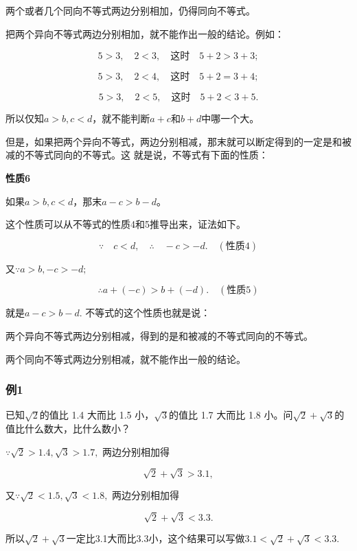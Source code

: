 两个或者几个同向不等式两边分别相加，仍得同向不等式。

把两个异向不等式两边分别相加，就不能作出一般的结论。例如：

\[
5>3, \quad 2 < 3, \quad \text{这时} \quad 5 + 2 > 3 + 3;
\]

\[
5>3, \quad 2 < 4, \quad \text{这时} \quad 5 + 2 = 3 + 4;
\]

\[
5>3, \quad 2 < 5, \quad \text{这时} \quad 5 + 2 < 3 + 5.
\]

所以仅知\(a > b, c < d\)，就不能判断\(a + c\)和\(b + d\)中哪一个大。

但是，如果把两个异向不等式，两边分别相减，那末就可以断定得到的一定是和被减的不等式同向的不等式。这
就是说，不等式有下面的性质：

\textbf{性质6}

如果\(a > b, c < d\)，那末\(a - c > b - d\)。

这个性质可以从不等式的性质4和5推导出来，证法如下。


\[
\because \quad c < d, \quad \therefore \quad - c > - d. \quad (\text{性质4})
\]

又\(\because a > b, -c > -d;\)

\[
\therefore a+(-c) > b + (- d). \quad (\text{性质} 5)
\]

就是\(a - c > b - d.\) 不等式的这个性质也就是说：

两个异向不等式两边分别相减，得到的是和被减的不等式同向的不等式。

 两个同向不等式两边分别相减，就不能作出一般的结论。

\subsubsection{例1}

已知\(\sqrt{2}\)的值比 1.4 大而比 1.5 小，\(\sqrt{3}\)的值比 1.7 大而比
1.8 小。问\(\sqrt{2} + \sqrt{3}\)的值比什么数大，比什么数小？

 \(\because \sqrt{2} > 1.4, \sqrt{3} > 1.7,\)
两边分别相加得

\[
\sqrt{2} + \sqrt{3} > 3.1,
\]

又\(\because \sqrt{2} < 1.5, \sqrt{3} < 1.8,\) 两边分别相加得

\[
\sqrt{2} + \sqrt{3} < 3.3.
\]

所以\(\sqrt{2} +\sqrt{3}\)一定比3.1大而比3.3小，这个结果可以写做\(3.1 < \sqrt{2} +\sqrt{3} < 3.3.\)

